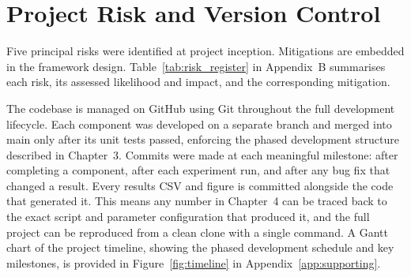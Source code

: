 \section{Project Risk and Version Control}
\label{sec:risk_analysis}

Five principal risks were identified at project inception. Mitigations are embedded in the framework design. Table~\ref{tab:risk_register} in Appendix~B summarises each risk, its assessed likelihood and impact, and the corresponding mitigation.

The codebase is managed on GitHub using Git throughout the full development lifecycle. Each component was developed on a separate branch and merged into main only after its unit tests passed, enforcing the phased development structure described in Chapter~3. Commits were made at each meaningful milestone: after completing a component, after each experiment run, and after any bug fix that changed a result. Every results CSV and figure is committed alongside the code that generated it. This means any number in Chapter~4 can be traced back to the exact script and parameter configuration that produced it, and the full project can be reproduced from a clean clone with a single command. A Gantt chart of the project timeline, showing the phased development schedule and key milestones, is provided in Figure~\ref{fig:timeline} in Appendix~\ref{app:supporting}.